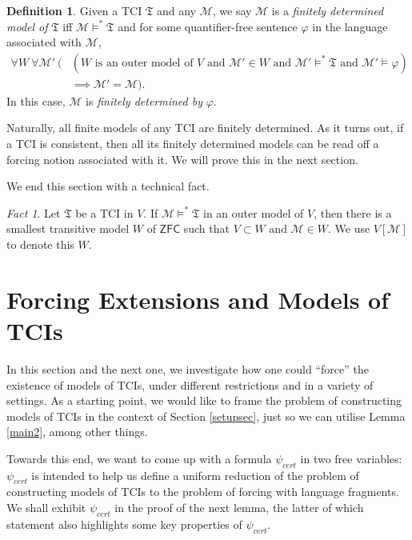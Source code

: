\documentclass[12pt, twoside]{memoir}
\numberwithin{equation}{section}
\theoremstyle{definition}
\newtheorem{defi}[thm]{Definition}
\theoremstyle{remark}
\newtheorem{fact}[thm]{Fact}
\theoremstyle{definition}
\theoremstyle{definition}
\theoremstyle{definition}
\theoremstyle{remark}
\begin{document}
\begin{defi}
Given a TCI $\mathfrak{T}$ and any $\mathcal{M}$, we say $\mathcal{M}$ is a \emph{finitely determined model of} $\mathfrak{T}$ iff $\mathcal{M} \models^* \mathfrak{T}$ and for some quantifier-free sentence $\varphi$ in the language associated with $\mathcal{M}$, 
\begin{align*}
    \forall W \ \forall \mathcal{M}' \ (&(W \text{ is an outer model of } V \text{ and } \mathcal{M}' \in W \text{ and } \mathcal{M}' \models^* \mathfrak{T} \text{ and } \mathcal{M}' \models \varphi) \\ 
    & \implies \mathcal{M}' = \mathcal{M}).
\end{align*}
In this case, $\mathcal{M}$ is \emph{finitely determined by} $\varphi$.
\end{defi}

Naturally, all finite models of any TCI are finitely determined. As it turns out, if a TCI is consistent, then all its finitely determined models can be read off a forcing notion associated with it. We will prove this in the next section.

We end this section with a technical fact.

\begin{fact}
Let $\mathfrak{T}$ be a TCI in $V$. If $\mathcal{M} \models^* \mathfrak{T}$ in an outer model of $V$, then there is a smallest transitive model $W$ of $\mathsf{ZFC}$ such that $V \subset W$ and $\mathcal{M} \in W$. We use $V[\mathcal{M}]$ to denote this $W$.
\end{fact}

\section{Forcing Extensions and Models of TCIs}\label{GOCon}

In this section and the next one, we investigate how one could ``force'' the existence of models of TCIs, under different restrictions and in a variety of settings. As a starting point, we would like to frame the problem of constructing models of TCIs in the context of Section \ref{setupsec}, just so we can utilise Lemma \ref{main2}, among other things. 

Towards this end, we want to come up with a formula $\psi_{cert}$ in two free variables: $\psi_{cert}$ is intended to help us define a uniform reduction of the problem of constructing models of TCIs to the problem of forcing with language fragments. We shall exhibit $\psi_{cert}$ in the proof of the next lemma, the latter of which statement also highlights some key properties of $\psi_{cert}$.
\end{document}
